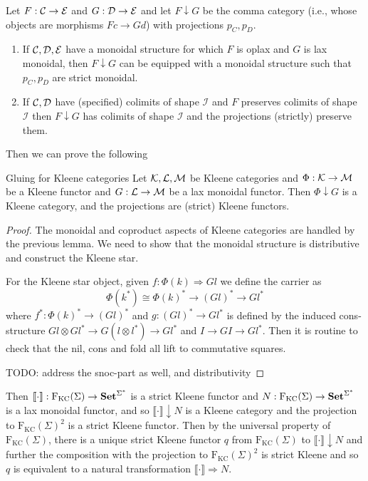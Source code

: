 \documentclass[acmsmall,anonymous,review,screen]{acmart}
\newcommand{\cat}[1]{
  \relax
  \StrLen{#1}[\arglength]
  \ifnum\arglength=1
  \mathcal{#1}
  \else
  \mathbf{#1}
  \fi
}
\newcommand{\FKC}{\textrm{F}_{\textrm{KC}}}
\newcommand{\sem}[1]{\llbracket{#1}\rrbracket}
\newcommand{\Set}{\cat{Set}}
\begin{document}
\begin{lemma}
  Let $F : \cat C \to \cat E$ and $G : \cat D \to \cat E$ and let $F
  \downarrow G$ be the comma category (i.e., whose objects are
  morphisms $F c \to G d$) with projections $p_C,p_D$.
  \begin{enumerate}
  \item If $\cat C, \cat D, \cat E$ have a monoidal structure for
    which $F$ is oplax and $G$ is lax monoidal, then $F \downarrow G$
    can be equipped with a monoidal structure such that $p_C,p_D$ are
    strict monoidal.
  \item If $\cat C, \cat D$ have (specified) colimits of shape
    $\mathcal I$ and $F$ preserves colimits of shape $\mathcal I$ then
    $F \downarrow G$ has colimits of shape $\mathcal I$ and the
    projections (strictly) preserve them.
  \end{enumerate}
\end{lemma}

Then we can prove the following
\begin{theorem}{Gluing for Kleene categories}
  Let $\cat K, \cat L, \cat M$ be Kleene categories and $\Phi : \cat K
  \to \cat M$ be a Kleene functor and $G : \cat L \to \cat M$ be a lax
  monoidal functor. Then $\Phi \downarrow G$ is a Kleene category, and
  the projections are (strict) Kleene functors.
\end{theorem}
\begin{proof}
  The monoidal and coproduct aspects of Kleene categories are handled
  by the previous lemma. We need to show that the monoidal structure
  is distributive and construct the Kleene star.

  For the Kleene star object, given $f :
  \Phi(k) \Rightarrow G l$ we define the carrier as
  \[ \Phi(k^*) \cong \Phi(k)^* \to (G l)^* \to G l^* \]
  where $f^* : \Phi(k)^* \to (G l)^*$ and $g : (G l)^* \to G l^*$ is
  defined by the induced cons-structure $G l \otimes G l^* \to G (l
  \otimes l^*) \to G l^*$ and $I \to G I \to G l^*$. Then it is
  routine to check that the nil, cons and fold all lift to commutative
  squares.

  TODO: address the snoc-part as well, and distributivity
\end{proof}

Then $\sem {\cdot} : \FKC(\Sigma) \to \Set^{\Sigma^*}$ is a strict
Kleene functor and $N : \FKC(\Sigma) \to \Set^{\Sigma^*}$ is a lax
monoidal functor, and so $\sem{\cdot}\downarrow N$ is a Kleene
category and the projection to $\FKC(\Sigma)^2$ is a strict Kleene
functor. Then by the universal property of $\FKC(\Sigma)$, there is a
unique strict Kleene functor $q$ from $\FKC(\Sigma)$ to
$\sem{\cdot}\downarrow N$ and further the composition with the
projection to $\FKC(\Sigma)^2$ is strict Kleene and so $q$ is
equivalent to a natural transformation $\sem{\cdot} \Rightarrow N$.
\end{document}
